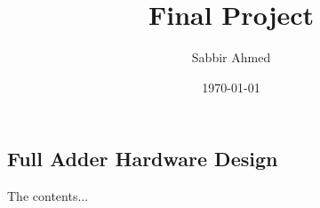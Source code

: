 \documentclass[titlepage]{article}
\title{Final Project}
\author{Sabbir Ahmed}
\date{\today}
\begin{document}
\maketitle
\tableofcontents
\newpage







\begin{appendices}
    \section{Full Adder Hardware Design}
    The contents...
\end{appendices}



\end{document}
